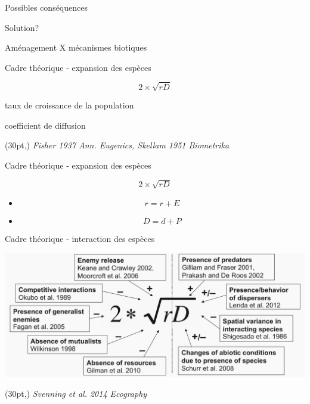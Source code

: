 \documentclass[11pt, compress, aspectratio=1610]{beamer}
\newcommand\smallcitation[1]{%
\begin{textblock*}{\textwidth}(30pt,\textheight)
	\raggedleft \footnotesize\textit{#1}
\end{textblock*}}
\providecommand{\tightlist}{%
  \setlength{\itemsep}{0pt}\setlength{\parskip}{0pt}}
\let\OldTexttt\texttt
\renewcommand{\texttt}[1]{\OldTexttt{\color{plTT}#1}}
\begin{document}
\begin{frame}{Possibles conséquences}
\begin{center}
\end{center}

\end{frame}

\begin{frame}{Solution?}


Aménagement X mécanismes biotiques

\end{frame}

\begin{frame}{Cadre théorique - expansion des espèces}

\begin{LARGE}
$$ 2 \times \sqrt{rD} $$
\end{LARGE}

\begin{description}
\tightlist
\item[r]
taux de croissance de la population
\item[D]
coefficient de diffusion
\end{description}

\smallcitation{Fisher 1937 Ann. Eugenics, Skellam 1951 Biometrika}

\end{frame}

\begin{frame}{Cadre théorique - expansion des espèces}

\begin{LARGE}
  $$ 2 \times \sqrt{rD} $$
\end{LARGE}

\begin{itemize}
  \item $$ r = r + E $$
  \pause
  \item $$ D = d + P $$
\end{itemize}

\end{frame}

\begin{frame}{Cadre théorique - interaction des espèces}

\centering
 \includegraphics[scale=0.8]{figures/Svenning2014.png}\par

\smallcitation{Svenning et al. 2014 Ecography}

\end{frame}
\end{document}
